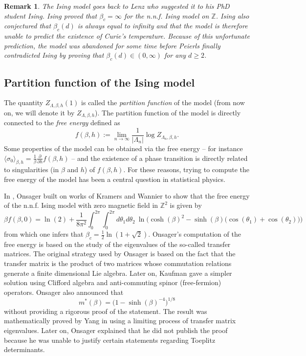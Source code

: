 \documentclass[a4paper,oneside,11pt]{article}
\newtheorem{remark}[theorem]{Remark}
\newcommand{\ee}{\end{equation}}
\newcommand{\be}{\begin{equation}}
\begin{document}
\begin{remark}The Ising model goes back to Lenz \cite{Len20} who suggested it to his PhD student Ising. Ising  \cite{Isi25} proved that $\beta_c=\infty$ for the n.n.f. Ising model on $\mathbb Z$. Ising also conjectured that $\beta_c(d)$ is always equal to infinity and that the model is therefore unable to predict the existence of Curie's temperature. Because of this unfortunate prediction, the model was abandoned for some time before Peierls \cite{Pei36} finally contradicted Ising by proving that $\beta_c(d)\in(0,\infty)$ for any $d\ge 2$. \end{remark}

\subsection{Partition function of the Ising model} 

The quantity $Z_{\Lambda,\beta,h}(1)$ is called the {\em partition function} of the model (from now on, we will denote it by $Z_{\Lambda,\beta,h}$). The partition function of the model is directly connected to the {\em free energy} defined as
\be\nonumber
f(\beta,h):=\lim_{n\rightarrow \infty}\frac{1}{|\Lambda_n|}\log Z_{\Lambda_n,\beta,h}.
\ee
Some properties of the model can be obtained via the free energy -- for instance
$
\langle \sigma_0\rangle_{\beta,h}=\frac1{\beta}\frac{\partial}{\partial h}f(\beta,h)
$ --
and the existence of a phase transition is directly related to singularities (in $\beta$ and $h$) of $f(\beta,h)$. 
For these reasons, trying to compute the free energy of the model has been a central question in statistical physics. 

In \cite{Ons44}, Onsager built on works of Kramers and Wannier \cite{KraWan41} to show that the free energy of the n.n.f. Ising model with zero magnetic field in $\mathbb Z^2$ is given by
\be\nonumber
\beta f(\beta,0)=\ln (2)+\frac1{8\pi^2}\int_0^{2\pi}\int_0^{2\pi}d\theta_1d\theta_2 \ \ln\Big(\cosh(\beta)^2-\sinh(\beta)\big(\cos(\theta_1)+\cos(\theta_2)\big)\Big)
\ee
from which one infers that $\beta_c=\tfrac12\ln(1+\sqrt 2)$. Onsager's computation of the free energy is based on the study of the eigenvalues of the so-called transfer matrices. The original strategy used by Onsager is based on the fact that the transfer matrix is the product of two matrices whose commutation relations generate a finite dimensional Lie algebra. Later on, Kaufman \cite{Kau49} gave a simpler solution using Clifford algebra and anti-commuting spinor (free-fermion) operators.
Onsager also announced that
\be\nonumber%
m^*(\beta)=\Big(1-\sinh(\beta)^{-4}\Big)^{1/8}
\ee
without providing a rigorous proof of the statement. The result was mathematically proved by Yang in \cite{Yan52} using a limiting process of transfer matrix eigenvalues. Later on, Onsager explained that he did not publish the proof because he was unable to justify certain statements regarding Toeplitz determinants.
\end{document}
